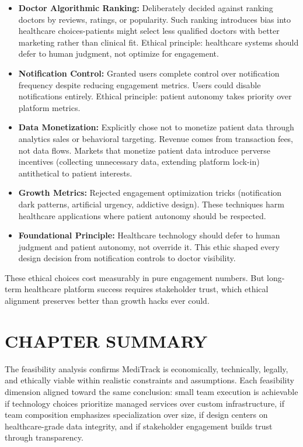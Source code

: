 \documentclass[12pt,a4paper]{report}
\begin{document}
\begin{itemize}
  \item \textbf{Doctor Algorithmic Ranking:} Deliberately decided against ranking doctors by reviews, ratings, or popularity. Such ranking introduces bias into healthcare choices-patients might select less qualified doctors with better marketing rather than clinical fit. Ethical principle: healthcare systems should defer to human judgment, not optimize for engagement.

  \item \textbf{Notification Control:} Granted users complete control over notification frequency despite reducing engagement metrics. Users could disable notifications entirely. Ethical principle: patient autonomy takes priority over platform metrics.

  \item \textbf{Data Monetization:} Explicitly chose not to monetize patient data through analytics sales or behavioral targeting. Revenue comes from transaction fees, not data flows. Markets that monetize patient data introduce perverse incentives (collecting unnecessary data, extending platform lock-in) antithetical to patient interests.

  \item \textbf{Growth Metrics:} Rejected engagement optimization tricks (notification dark patterns, artificial urgency, addictive design). These techniques harm healthcare applications where patient autonomy should be respected.

  \item \textbf{Foundational Principle:} Healthcare technology should defer to human judgment and patient autonomy, not override it. This ethic shaped every design decision from notification controls to doctor visibility.
\end{itemize}

These ethical choices cost measurably in pure engagement numbers. But long-term healthcare platform success requires stakeholder trust, which ethical alignment preserves better than growth hacks ever could.

\section*{CHAPTER SUMMARY}

The feasibility analysis confirms MediTrack is economically, technically, legally, and ethically viable within realistic constraints and assumptions. Each feasibility dimension aligned toward the same conclusion: small team execution is achievable if technology choices prioritize managed services over custom infrastructure, if team composition emphasizes specialization over size, if design centers on healthcare-grade data integrity, and if stakeholder engagement builds trust through transparency.
\end{document}
